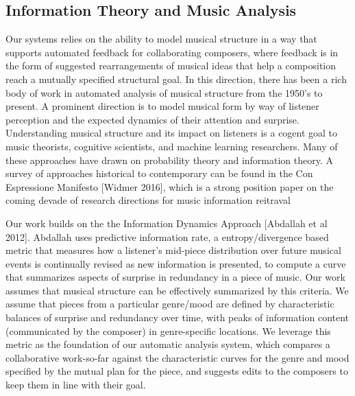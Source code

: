 \documentclass[final,authoryear,11pt,times]{elsarticle}
\begin{document}
\subsection{Information Theory and Music Analysis}

Our systems relies on the ability to model musical structure in a way that supports automated feedback for collaborating composers, where feedback is in the form of suggested rearrangements of musical ideas that help a composition reach a mutually specified structural goal. In this direction, there has been a rich body of work in automated analysis of musical structure from the 1950's to present. A prominent direction is to model musical form by way of listener perception and the expected dynamics of their attention and surprise. Understanding musical structure and its impact on listeners is a cogent goal to music theorists, cognitive scientists, and machine learning researchers. Many of these approaches have drawn on probability theory and information theory. A survey of approaches historical to contemporary can be found in the Con Espressione Manifesto [Widmer 2016], which is a strong position paper on the coming devade of research directions for music information reitraval

Our work builds on the the Information Dynamics Approach [Abdallah et al 2012]. Abdallah uses predictive information rate, a entropy/divergence based metric that measures how a listener's mid-piece distribution over future musical events is continually revised as new information is presented, to compute a curve that summarizes aspects of surprise in redundancy in a piece of music. Our work assumes that musical structure can be effectively summarized by this criteria. We assume that pieces from a particular genre/mood are defined by characteristic balances of surprise and redundancy over time, with peaks of information content (communicated by the composer) in genre-specific locations. We leverage this metric as the foundation of our automatic analysis system, which compares a collaborative work-so-far against the characteristic curves for the genre and mood specified by the mutual plan for the piece, and suggests edits to the composers to keep them in line with their goal.


\end{document}
